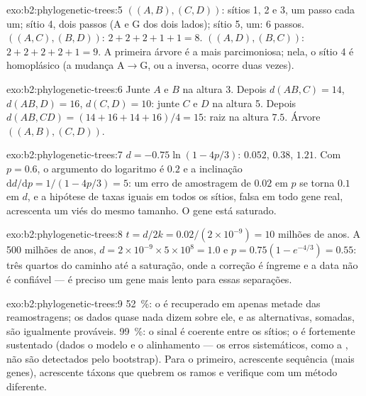 \begin{solution}{exo:b2:phylogenetic-trees:5}
$((A,B),(C,D))$: sítios 1, 2 e 3, um passo cada um; sítio 4, dois passos
($\mathrm{A}$ e $\mathrm{G}$ dos dois lados); sítio 5, um: 6 passos.
$((A,C),(B,D))$: $2 + 2 + 2 + 1 + 1 = 8$. $((A,D),(B,C))$: $2 + 2 + 2 +
2 + 1 = 9$. A primeira árvore é a mais parcimoniosa; nela, o sítio 4 é
homoplásico (a mudança $\mathrm{A}\to\mathrm{G}$, ou a inversa,
ocorre duas vezes).
\end{solution}

\begin{solution}{exo:b2:phylogenetic-trees:6}
Junte $A$ e $B$ na altura 3. Depois $d(AB,C) = 14$, $d(AB,D) = 16$,
$d(C,D) = 10$: junte $C$ e $D$ na altura 5. Depois $d(AB,CD) = (14 + 16
+ 14 + 16)/4 = 15$: raiz na altura $7.5$. Árvore $((A,B),(C,D))$.
\end{solution}

\begin{solution}{exo:b2:phylogenetic-trees:7}
$d = -0.75\ln(1 - 4p/3)$: $0.052$, $0.38$, $1.21$. Com $p = 0.6$, o
argumento do logaritmo é $0.2$ e a inclinação $\mathrm{d}d/\mathrm{d}p
= 1/(1 - 4p/3) = 5$: um erro de amostragem de $0.02$ em $p$ se torna
$0.1$ em $d$, e a hipótese de taxas iguais em todos os sítios, falsa em
todo gene real, acrescenta um viés do mesmo tamanho. O gene está
saturado.
\end{solution}

\begin{solution}{exo:b2:phylogenetic-trees:8}
$t = d/2k = 0.02/(2\times 10^{-9}) = 10$ milhões de anos. A 500
milhões de anos, $d = 2\times 10^{-9}\times 5\times 10^{8} = 1.0$ e
$p = 0.75(1 - e^{-4/3}) = 0.55$: três quartos do caminho até a
saturação, onde a correção é íngreme e a data não é confiável --- é
preciso um gene mais lento para essas separações.
\end{solution}

\begin{solution}{exo:b2:phylogenetic-trees:9}
\qty{52}{\%}: o  é recuperado em apenas metade das reamostragens;
os dados quase nada dizem sobre ele, e as alternativas, somadas, são
igualmente prováveis. \qty{99}{\%}: o sinal é coerente entre os sítios;
o  é fortemente sustentado (dados o modelo e o alinhamento --- os
erros sistemáticos, como a , não são detectados
pelo bootstrap). Para o primeiro, acrescente sequência (mais genes),
acrescente táxons que quebrem os ramos e verifique com um método
diferente.
\end{solution}

